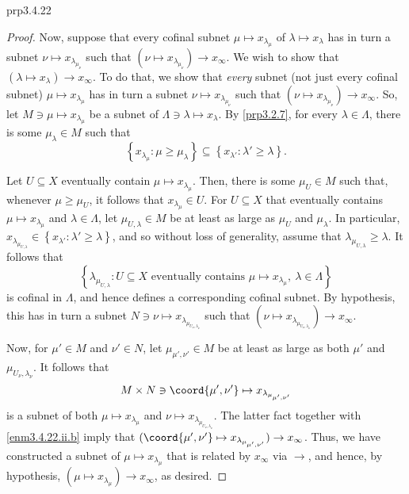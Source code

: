 \begin{prp}{}{prp3.4.22}
\begin{proof}
Now, suppose that every cofinal subnet $\mu \mapsto x_{\lambda _{\mu}}$ of $\lambda \mapsto x_{\lambda}$ has in turn a subnet $\nu \mapsto x_{\lambda _{\mu _{\nu}}}$ such that $(\nu \mapsto x_{\lambda _{\mu _{\nu}}})\to x_{\infty}$.  We wish to show that $(\lambda \mapsto x_{\lambda})\to x_{\infty}$.  To do that, we show that \emph{every} subnet (not just every cofinal subnet) $\mu \mapsto x_{\lambda _{\mu}}$ has in turn a subnet $\nu \mapsto x_{\lambda _{\mu _{\nu}}}$ such that $(\nu \mapsto x_{\lambda _{\mu _{\nu}}})\to x_{\infty}$.  So, let $M\ni \mu \mapsto x_{\lambda _{\mu}}$ be a subnet of $\Lambda \ni \lambda \mapsto x_{\lambda}$.  By \cref{prp3.2.7}, for every $\lambda \in \Lambda$, there is some $\mu _{\lambda}\in M$ such that
\begin{equation}
\left\{ x_{\lambda _{\mu}}:\mu \geq \mu _{\lambda}\right\} \subseteq \left\{ x_{\lambda '}:\lambda '\geq \lambda \right\} .
\end{equation}

Let $U\subseteq X$ eventually contain $\mu \mapsto x_{\lambda _{\mu}}$.  Then, there is some $\mu _U\in M$ such that, whenever $\mu \geq \mu _U$, it follows that $x_{\lambda _{\mu}}\in U$.  For $U\subseteq X$ that eventually contains $\mu \mapsto x_{\lambda _{\mu}}$ and $\lambda \in \Lambda$, let $\mu _{U,\lambda}\in M$ be at least as large as $\mu _U$ and $\mu _{\lambda}$.  In particular, $x_{\lambda _{\mu _{U,\lambda}}}\in \left\{ x_{\lambda '}:\lambda '\geq \lambda \right\}$, and so without loss of generality, assume that $\lambda _{\mu _{U,\lambda}}\geq \lambda$.  It follows that
\begin{equation*}
\left\{ \lambda _{\mu _{U,\lambda}}:U\subseteq X\text{ eventually contains }\mu \mapsto x_{\lambda _{\mu}},\ \lambda \in \Lambda \right\}
\end{equation*}
is cofinal in $\Lambda$, and hence defines a corresponding cofinal subnet.  By hypothesis, this has in turn a subnet $N\ni \nu \mapsto x_{\lambda _{\mu _{U_{\nu},\lambda _{\nu}}}}$ such that $(\nu \mapsto x_{\lambda _{\mu _{U_{\nu},\lambda _{\nu}}}})\to x_{\infty}$.

Now, for $\mu '\in M$ and $\nu '\in N$, let $\mu _{\mu ',\nu '}\in M$ be at least as large as both $\mu '$ and $\mu _{U_{\nu},\lambda _{\nu}}$.  It follows that
\begin{equation}
M\times N\ni \coord{\mu ',\nu '}\mapsto x_{\lambda _{\mu _{\mu ',\nu '}}}
\end{equation}
is a subnet of both $\mu \mapsto x_{\lambda _{\mu}}$ and $\nu \mapsto x_{\lambda _{\mu _{U_{\nu},\lambda _{\nu}}}}$.  The latter fact together with \cref{enm3.4.22.ii.b} imply that $(\coord{\mu ',\nu '}\mapsto x_{\lambda _{\mu _{\mu ',\nu '}}})\to x_{\infty}$.  Thus, we have constructed a subnet of $\mu \mapsto x_{\lambda _{\mu}}$ that is related by $x_{\infty}$ via $\to$, and hence, by hypothesis, $(\mu \mapsto x_{\lambda _{\mu}})\to x_{\infty}$, as desired.


\end{proof}
\end{prp}
